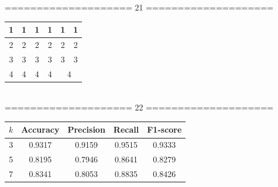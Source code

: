 \documentclass[12pt, a4paper, onecolumn]{article}
\begin{document}
\begin{center}
====================  21  ====================\\[15pt]
%

{
	\begin{tabular}{|c|c|c|c|c|c|}
		\hline
		1 & 1 & 1 & 1 & 1 & 1\\
		\hline
		2 & {\cellcolor{red}2} & 2 & 2 & {\cellcolor[gray]{0.7}2} & 2\\ %
		\hline
		3 & 3 & 3 & 3 & 3 & 3\\
		\hline
		4 & 4 & 4 & 4 & \multicolumn{2}{|c|}{{\cellcolor[rgb]{0.7, 0.5, 1}4}}\\ %
		\hline
	\end{tabular}
}\\[20pt]



====================  22  ====================\\[15pt]
%

\begin{tabular}{ccccc}
	\toprule
	$k$ & Accuracy & Precision & Recall & F1-score \\
	\midrule
	3 & 0.9317 & 0.9159 & 0.9515 & 0.9333 \\
	5 & 0.8195 & 0.7946 & 0.8641 & 0.8279 \\
	7 & 0.8341 & 0.8053 & 0.8835 & 0.8426 \\
	\bottomrule
\end{tabular}\\[20pt]


\end{center} 
\end{document}
